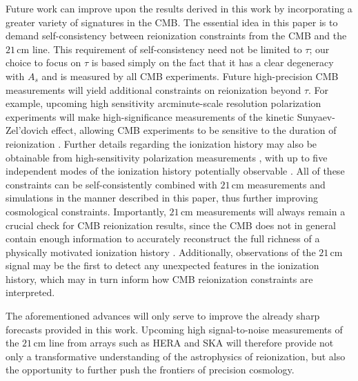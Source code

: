 \documentclass[twocolumn,aps,prd,nofootinbib,showpacs,superscriptaddress]{revtex4-1}
\begin{document}
Future work can improve upon the results derived in this work by incorporating a greater variety of signatures in the CMB. The essential idea in this paper is to demand self-consistency between reionization constraints from the CMB and the $21\,\textrm{cm}$ line. This requirement of self-consistency need not be limited to $\tau$; our choice to focus on $\tau$ is based simply on the fact that it has a clear degeneracy with $A_s$ and is measured by all CMB experiments. Future high-precision CMB measurements will yield additional constraints on reionization beyond $\tau$. For example, upcoming high sensitivity arcminute-scale resolution polarization experiments will make high-significance measurements of the kinetic Sunyaev-Zel'dovich effect, allowing CMB experiments to be sensitive to the duration of reionization \cite{calabrese_et_al2014}. Further details regarding the ionization history may also be obtainable from high-sensitivity polarization measurements \cite{hu_and_holder2003,dai_et_al2015}, with up to five independent modes of the ionization history potentially observable \cite{mortonson_and_hu2008}. All of these constraints can be self-consistently combined with $21\,\textrm{cm}$ measurements and simulations in the manner described in this paper, thus further improving cosmological constraints. Importantly, $21\,\textrm{cm}$ measurements will always remain a crucial check for CMB reionization results, since the CMB does not in general contain enough information to accurately reconstruct the full richness of a physically motivated ionization history \cite{MoradinezhadDizgah_et_al2013}. Additionally, observations of the $21\,\textrm{cm}$ signal may be the first to detect any unexpected features in the ionization history, which may in turn inform how CMB reionization constraints are interpreted.

The aforementioned advances will only serve to improve the already sharp forecasts provided in this work. Upcoming high signal-to-noise measurements of the $21\,\textrm{cm}$ line from arrays such as HERA and SKA will therefore provide not only a transformative understanding of the astrophysics of reionization, but also the opportunity to further push the frontiers of precision cosmology.
\end{document}
